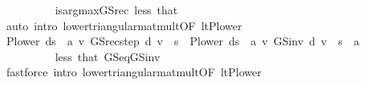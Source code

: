 \begin{isabellebody}
\ \ \ \ \ \ \ \ \isamarkupfalse%
\ is{\isacharunderscore}{\kern0pt}arg{\isacharunderscore}{\kern0pt}max{\isacharunderscore}{\kern0pt}GS{\isacharunderscore}{\kern0pt}rec{\isacharprime}{\kern0pt}\ less{\isacharparenleft}{\kern0pt}{}{\isacharparenright}{\kern0pt}\ that\isanewline
\ \ \ \ \ \ \ \ \isamarkupfalse%
\ {\isacharparenleft}{\kern0pt}auto\ intro{\isacharbang}{\kern0pt}{\isacharcolon}{\kern0pt}\ lower{\isacharunderscore}{\kern0pt}triangular{\isacharunderscore}{\kern0pt}mat{\isacharunderscore}{\kern0pt}mult{\isacharbrackleft}{\kern0pt}OF\ lt{\isacharunderscore}{\kern0pt}P{\isacharunderscore}{\kern0pt}lower{\isacharbrackright}{\kern0pt}{\isacharparenright}{\kern0pt}\isanewline
\ \ \ \ \ \ \isamarkupfalse%
\ \isamarkupfalse%
\ {\isachardoublequoteopen}{\isacharparenleft}{\kern0pt}{\isacharparenleft}{\kern0pt}P{\isacharunderscore}{\kern0pt}lower\ {\isacharparenleft}{\kern0pt}d{\isacharparenleft}{\kern0pt}s\ {\isacharcolon}{\kern0pt}{\isacharequal}{\kern0pt}\ a{\isacharparenright}{\kern0pt}{\isacharparenright}{\kern0pt}\ {\isacharasterisk}{\kern0pt}v\ GS{\isacharunderscore}{\kern0pt}rec{\isacharunderscore}{\kern0pt}step\ d\ v{\isacharparenright}{\kern0pt}\ {\isachardollar}{\kern0pt}\ s{\isacharparenright}{\kern0pt}\ {\isacharequal}{\kern0pt}\ {\isacharparenleft}{\kern0pt}P{\isacharunderscore}{\kern0pt}lower\ {\isacharparenleft}{\kern0pt}d{\isacharparenleft}{\kern0pt}s\ {\isacharcolon}{\kern0pt}{\isacharequal}{\kern0pt}\ a{\isacharparenright}{\kern0pt}{\isacharparenright}{\kern0pt}\ {\isacharasterisk}{\kern0pt}v\ GS{\isacharunderscore}{\kern0pt}inv\ d\ v{\isacharparenright}{\kern0pt}\ {\isachardollar}{\kern0pt}\ s{\isachardoublequoteclose}\ \ a\ \ \ \ \ \ \isanewline
\ \ \ \ \ \ \ \ \isamarkupfalse%
\ less{\isacharparenleft}{\kern0pt}{}{\isacharparenright}{\kern0pt}\ that\ GS{\isacharunderscore}{\kern0pt}eq{\isacharunderscore}{\kern0pt}GS{\isacharunderscore}{\kern0pt}inv\isanewline
\ \ \ \ \ \ \ \ \isamarkupfalse%
\ {\isacharparenleft}{\kern0pt}fastforce\ intro{\isacharbang}{\kern0pt}{\isacharcolon}{\kern0pt}\ lower{\isacharunderscore}{\kern0pt}triangular{\isacharunderscore}{\kern0pt}mat{\isacharunderscore}{\kern0pt}mult{\isacharbrackleft}{\kern0pt}OF\ lt{\isacharunderscore}{\kern0pt}P{\isacharunderscore}{\kern0pt}lower{\isacharbrackright}{\kern0pt}{\isacharparenright}{\kern0pt}\isanewline
\ \ \ \ \ \ \isamarkupfalse%
\ \isamarkupfalse%

\end{isabellebody}
